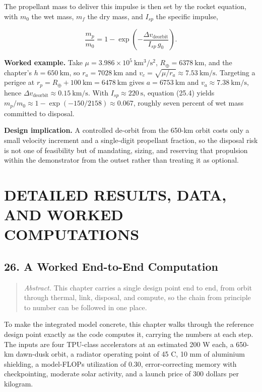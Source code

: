 \documentclass[
  11pt,
  openany,
  oneside]{book}
\begin{document}
The propellant mass to deliver this impulse is then set by the rocket
equation, with \(m_0\) the wet mass, \(m_f\) the dry mass, and
\(I_{sp}\) the specific impulse,

\begin{equation}
\frac{m_p}{m_0} = 1 - \exp\!\left(-\frac{\Delta v_{\mathrm{deorbit}}}{I_{sp}\, g_0}\right). \tag{25.4}
\end{equation}

\textbf{Worked example.} Take
\(\mu = 3.986\times10^{5}\ \mathrm{km^{3}/s^{2}}\),
\(R_\oplus = 6378\ \mathrm{km}\), and the chapter's
\(h = 650\ \mathrm{km}\), so \(r_a = 7028\ \mathrm{km}\) and
\(v_c = \sqrt{\mu/r_a} \approx 7.53\ \mathrm{km/s}\). Targeting a
perigee at \(r_p = R_\oplus + 100\ \mathrm{km} = 6478\ \mathrm{km}\)
gives \(a = 6753\ \mathrm{km}\) and \(v_a \approx 7.38\ \mathrm{km/s}\),
hence \(\Delta v_{\mathrm{deorbit}} \approx 0.15\ \mathrm{km/s}\). With
\(I_{sp} \approx 220\ \mathrm{s}\), equation (25.4) yields
\(m_p/m_0 \approx 1 - \exp(-150/2158) \approx 0.067\), roughly seven
percent of wet mass committed to disposal.

\textbf{Design implication.} A controlled de-orbit from the 650-km orbit
costs only a small velocity increment and a single-digit propellant
fraction, so the disposal risk is not one of feasibility but of
mandating, sizing, and reserving that propulsion within the demonstrator
from the outset rather than treating it as optional.

\part{DETAILED RESULTS, DATA, AND WORKED
COMPUTATIONS}\label{detailed-results-data-and-worked-computations}

\chapter{26. A Worked End-to-End
Computation}\label{a-worked-end-to-end-computation}

\begin{quote}
\emph{Abstract.} This chapter carries a single design point end to end,
from orbit through thermal, link, disposal, and compute, so the chain
from principle to number can be followed in one place.
\end{quote}

To make the integrated model concrete, this chapter walks through the
reference design point exactly as the code computes it, carrying the
numbers at each step. The inputs are four TPU-class accelerators at an
estimated 200 W each, a 650-km dawn-dusk orbit, a radiator operating
point of 45 C, 10 mm of aluminium shielding, a model-FLOPs utilization
of 0.30, error-correcting memory with checkpointing, moderate solar
activity, and a launch price of 300 dollars per kilogram.
\end{document}
